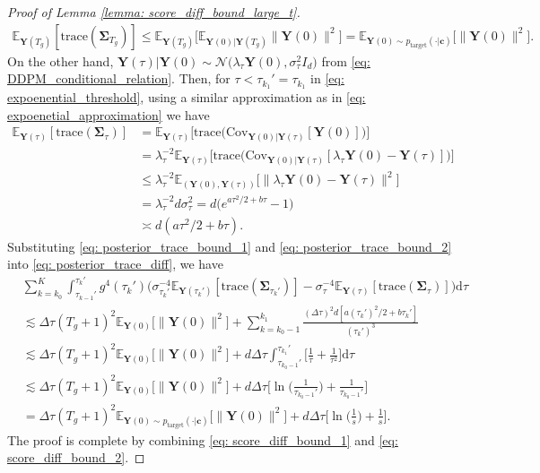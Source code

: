 \documentclass[11pt]{article}
\newcommand{\mE}{\mathbb{E}}
\newcommand{\bY}{\mathbf{Y}}
\newcommand{\bc}{\mathbf{c}}
\newcommand{\bSimga}{\boldsymbol{\Sigma}}
\newcommand{\tar}{{\text{target}}}
\newcommand{\cov}{{\text{Cov}}}
\newcommand{\intd}{\mathrm{d}}
\begin{document}
\begin{proof}[Proof of Lemma \ref{lemma: score_diff_bound_large_t}]
\begin{align}\label{eq: posterior_trace_bound_1}
    \mE_{\bY(T_g)}[\text{trace}(\bSimga_{T_g})] \le \mE_{\bY(T_g)}\big[\mE_{\bY(0)|\bY(T_g)}\|\bY(0)\|^2\big] = \mE_{\bY(0)\sim p_\tar(\cdot | \bc)}\big[\|\bY(0)\|^2\big].
\end{align}
On the other hand, $\bY(\tau) | \bY(0) \sim \mathcal{N}\big(\lambda_\tau\bY(0), \sigma_\tau^2I_d\big)$ from \eqref{eq: DDPM_conditional_relation}. Then, for $\tau < \tau_{k_1}' = \tau_{k_1}$ in \eqref{eq: expoenential_threshold}, using a similar approximation as in \eqref{eq: expoenetial_approximation} we have
\begin{align}
    \mE_{\bY(\tau)}[\text{trace}(\bSimga_{\tau})] &= \mE_{\bY(\tau)}\big[\text{trace}\big(\cov_{\bY(0)|\bY(\tau)}[\bY(0)]\big)\big]\nonumber\\
    &=\lambda_{\tau}^{-2}\mE_{\bY(\tau)} \big[\text{trace}\big(\cov_{\bY(0)|\bY(\tau)}[\lambda_{\tau}\bY(0) - \bY(\tau)]\big)\big] \nonumber\\
    &\le \lambda_{\tau}^{-2}\mE_{(\bY(0), \bY(\tau))} \big[\|\lambda_{\tau}\bY(0) - \bY(\tau)\|^2\big] \nonumber\\
    &= \lambda_\tau^{-2}d\sigma_\tau^2 = d\big(e^{a\tau^2/2 + b\tau} - 1\big)\nonumber\\
    &\asymp d(a\tau^2/2 + b\tau). \label{eq: posterior_trace_bound_2}
\end{align}
Substituting \eqref{eq: posterior_trace_bound_1} and \eqref{eq: posterior_trace_bound_2} into \eqref{eq: posterior_trace_diff}, we have
\begin{align}
    &\sum_{k=k_0}^{K}\int_{\tau_{k - 1}'}^{\tau_k'}g^4(\tau_k') \big(\sigma_{\tau_k'}^{-4}\mE_{\bY(\tau_k')}[\text{trace}(\bSimga_{\tau_k'})] - \sigma_{\tau}^{-4}\mE_{\bY(\tau)}[\text{trace}(\bSimga_{\tau})]\big)\intd\tau \nonumber\\
    &\lesssim  \Delta\tau(T_g + 1)^2 \mE_{\bY(0)}\big[\|\bY(0)\|^2\big] + \sum_{k=k_0 - 1}^{k_1} \frac{(\Delta\tau)^2d[a(\tau_k')^2/2 + b\tau_k'
    ]}{(\tau_k')^3} \nonumber \\
    &\lesssim \Delta\tau(T_g + 1)^2 \mE_{\bY(0)}\big[\|\bY(0)\|^2\big]  + d\Delta\tau  \int_{\tau_{k_0 - 1}'}^{\tau_{k_1}'}\bigg[\frac{1}{\tau} + \frac{1}{\tau^2}\bigg] \intd\tau \nonumber\\
    &\lesssim \Delta\tau(T_g + 1)^2\mE_{\bY(0)}\big[\|\bY(0)\|^2\big]  + d\Delta\tau\bigg[\ln\bigg(\frac{1}{\tau_{k_0 - 1}'} \bigg) + \frac{1}{\tau_{k_0 - 1}'}\bigg]\nonumber\\
    &= \Delta\tau(T_g + 1)^2\mE_{\bY(0)\sim p_\tar(\cdot | \bc)}\big[\|\bY(0)\|^2\big]  + d\Delta\tau\bigg[\ln\bigg(\frac{1}{s} \bigg) + \frac{1}{s}\bigg]. \label{eq: score_diff_bound_2}
\end{align}
The proof is complete by combining \eqref{eq: score_diff_bound_1} and \eqref{eq: score_diff_bound_2}.
\end{proof}
\end{document}
